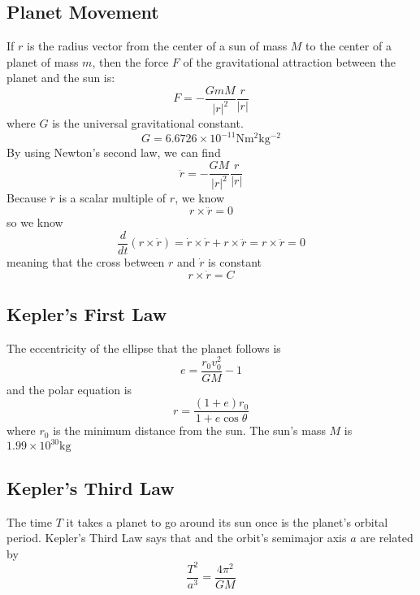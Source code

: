 \documentclass[12pt]{article}
\theoremstyle{break}
\numberwithin{theorem}{subsection}
\numberwithin{lemma}{subsection}
\numberwithin{corollary}{subsection}
\numberwithin{equation}{subsection}
\begin{document}
\subsection{Planet Movement}
If $r$ is the radius vector from the center of a sun of mass $M$ to the center of a planet of mass $m$,
then the force $F$ of the gravitational attraction between the planet and the sun is:
\begin{equation*}
F = - \frac{GmM}{|r|^2} \frac{r}{|r|}
\end{equation*}
where $G$ is the universal gravitational constant. 
\begin{equation*}
G = 6.6726 \times 10^{-11} \si{\newton \meter^2 \kilogram^{-2}}
\end{equation*}
By using Newton's second law, we can find
\begin{equation*}
\ddot r = - \frac{GM}{|r|^2} \frac{r}{|r|}
\end{equation*}
Because $\ddot r$ is a scalar multiple of $r$, we know 
\begin{equation*}
r \times \ddot r = 0
\end{equation*}
so we know
\begin{equation*}
\frac{d}{dt} (r \times \dot r) = \dot r \times \dot r + r \times \ddot r = r \times \ddot r = 0
\end{equation*}
meaning that the cross between $r$ and $\dot r$ is constant
\begin{equation*}
r \times \dot r = C
\end{equation*}

\subsection{Kepler's First Law}
The eccentricity of the ellipse that the planet follows is 
\begin{equation*}
e = \frac{r_0 v_0^2}{GM} - 1
\end{equation*}
and the polar equation is 
\begin{equation*}
r = \frac{(1+e)r_0}{1+e \cos \theta}
\end{equation*}
where $r_0$ is the minimum distance from the sun. The sun's mass $M$ is 
$1.99 \times 10^{30} \si{ \kilogram}$

\subsection{Kepler's Third Law}
The time $T$ it takes a planet to go around its sun once is the planet's orbital period. Kepler's
Third Law says that and the orbit's semimajor axis $a$ are related by
\begin{equation*}
\frac{T^2}{a^3} = \frac{4\pi^2}{GM}
\end{equation*}
\end{document}
